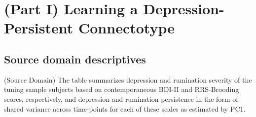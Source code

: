 \documentclass[
  notitlepage]{article}
\begin{document}
\hypertarget{part-i-learning-a-depression-persistent-connectotype}{%
\section{(Part I) Learning a Depression-Persistent
Connectotype}\label{part-i-learning-a-depression-persistent-connectotype}}
\hypertarget{source-domain-descriptives}{%
\subsection{Source domain
descriptives}\label{source-domain-descriptives}}
\begin{sidewaystable}
\begin{minipage}{\textwidth}
\centering
{}
\vspace{\baselineskip}
\end{minipage}
\caption{(Source Domain) \scriptsize{The table summarizes depression and rumination severity of the tuning sample subjects based on contemporaneous BDI-II and RRS-Brooding scores, respectively, and depression and rumination persistence in the form of shared variance across time-points for each of these scales as estimated by PC1.}}
\end{sidewaystable}
\setlength{\belowcaptionskip}{-10pt}
\end{document}
